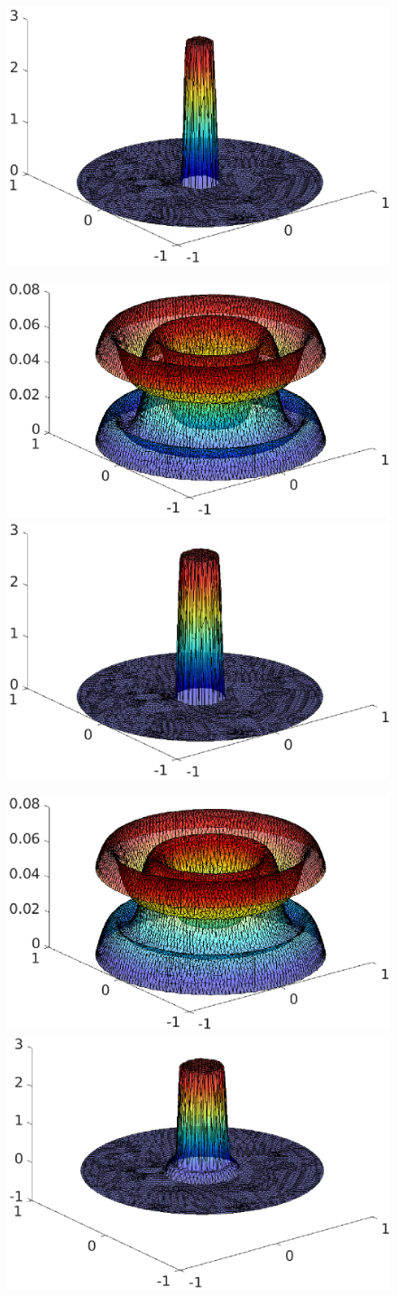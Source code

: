 \begin{frame}
\begin{overprint}
\begin{figure}
\quad
\includegraphics[width=0.48 \textwidth]{fig_article_chap_2/test_case_128/fig_lambda_hmax0,09_Dt0,001_tt09.eps} 
\end{figure}
\begin{figure}
\includegraphics[width=0.48 \textwidth]{fig_article_chap_2/test_case_128/fig_u1u2_hmax0,09_Dt0,001_tt10.eps} 
\quad
\includegraphics[width=0.48 \textwidth]{fig_article_chap_2/test_case_128/fig_lambda_hmax0,09_Dt0,001_tt10.eps} 
\end{figure}
\begin{figure}
\includegraphics[width=0.48 \textwidth]{fig_article_chap_2/test_case_128/fig_u1u2_hmax0,09_Dt0,001_tt11.eps} 
\quad
\includegraphics[width=0.48 \textwidth]{fig_article_chap_2/test_case_128/fig_lambda_hmax0,09_Dt0,001_tt11.eps} 

\end{figure}
\end{overprint}
\end{frame}
